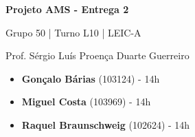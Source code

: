 \documentclass[12pt,a4paper]{article}
\begin{document}
\begin{titlepage}
  \begin{center}
    \vspace*{5cm}
    \Huge
    \textbf{Projeto AMS - Entrega 2}

    \vspace{0.5cm}
    \LARGE
    Grupo 50 | Turno L10 | LEIC-A

    \vspace{0.5cm}
    \large
    Prof. Sérgio Luís Proença Duarte Guerreiro

    \vfill
    \large
    \begin{minipage}{0.8\textwidth}
      \begin{itemize}
        \item[] \textbf{Gonçalo Bárias} (103124) - 14h
        \item[] \textbf{Miguel Costa} (103969) - 14h
        \item[] \textbf{Raquel Braunschweig} (102624) - 14h
      \end{itemize}
    \end{minipage}
  \end{center}
\end{titlepage}

%     
%
%     
%
%     
%
%     
\end{document}
